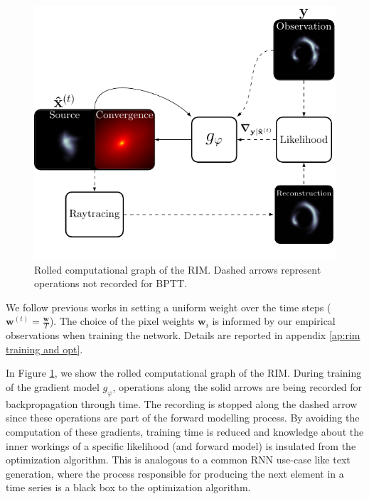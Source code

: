 \begin{figure}[t!]
        \centering
		\includegraphics[width=\linewidth]{figures/schematic_rim}
        \caption{Rolled computational graph of the RIM. Dashed arrows represent operations not recorded for BPTT.}
        \label{fig:rolled graph}
\end{figure}


We follow previous works in setting a uniform weight over the time 
steps ($\mathbf{w}^{(t)} = \frac{\mathbf{w}}{T}$). 
The choice of the pixel weights $\mathbf{w}_i$ is informed 
by our empirical observations when training the network. Details 
are reported in appendix \ref{ap:rim training and opt}.

In Figure \ref{fig:rolled graph}, we show the rolled computational graph of the 
RIM. During training of the gradient model $g_\varphi$, operations along the solid arrows are being 
recorded for backpropagation through time. 
The recording is stopped along the dashed arrow since these operations 
are part of the forward modelling process.
By avoiding the computation of these gradients, training time is reduced and 
knowledge about the inner workings  
of a specific likelihood (and forward model) is insulated from the optimization algorithm.
This is analogous to a common RNN use-case like text generation, where the process responsible 
for producing the next element in a time series is a black box to the optimization 
algorithm. 


